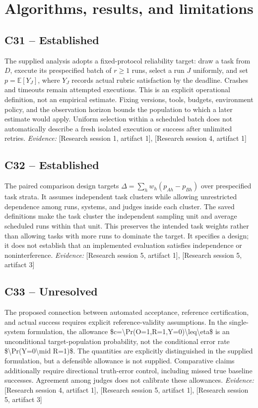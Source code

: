 \documentclass[11pt]{article}
\begin{document}
\section{Algorithms, results, and limitations}
\subsection{C31 -- Established}
The supplied analysis adopts a fixed-protocol reliability target: draw a task from $D$, execute its prespecified batch of $r\geq 1$ runs, select a run $J$ uniformly, and set $p=\mathbb{E}[Y_J]$, where $Y_J$ records actual rubric satisfaction by the deadline. Crashes and timeouts remain attempted executions.
This is an explicit operational definition, not an empirical estimate. Fixing versions, tools, budgets, environment policy, and the observation horizon bounds the population to which a later estimate would apply. Uniform selection within a scheduled batch does not automatically describe a fresh isolated execution or success after unlimited retries.
\textit{Evidence: }[Research session 1, artifact 1], [Research session 4, artifact 1]
\subsection{C32 -- Established}
The paired comparison design targets $\Delta=\sum_h w_h(p_{Ah}-p_{Bh})$ over prespecified task strata. It assumes independent task clusters while allowing unrestricted dependence among runs, systems, and judges inside each cluster.
The saved definitions make the task cluster the independent sampling unit and average scheduled runs within that unit. This preserves the intended task weights rather than allowing tasks with more runs to dominate the target. It specifies a design; it does not establish that an implemented evaluation satisfies independence or noninterference.
\textit{Evidence: }[Research session 5, artifact 1], [Research session 5, artifact 3]
\subsection{C33 -- Unresolved}
The proposed connection between automated acceptance, reference certification, and actual success requires explicit reference-validity assumptions. In the single-system formulation, the allowance \$c=\textbackslash{}Pr(O=1,R=1,Y=0)\textbackslash{}leq\textbackslash{}eta\$ is an unconditional target-population probability, not the conditional error rate \$\textbackslash{}Pr(Y=0\textbackslash{}mid R=1)\$.
The quantities are explicitly distinguished in the supplied formulation, but a defensible allowance is not supplied. Comparative claims additionally require directional truth-error control, including missed true baseline successes. Agreement among judges does not calibrate these allowances.
\textit{Evidence: }[Research session 4, artifact 1], [Research session 5, artifact 1], [Research session 5, artifact 3]
\end{document}
